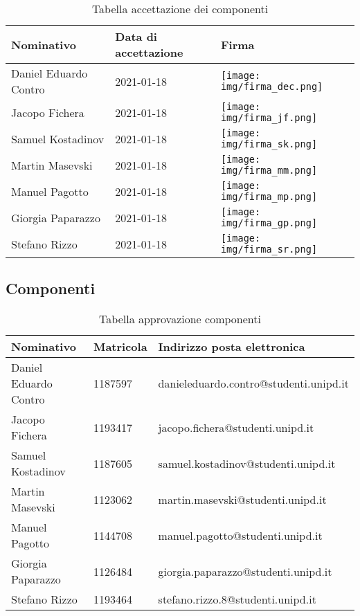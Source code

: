 \documentclass[../piano_di_progetto.tex]{subfiles}
\begin{document}
\begin{table}[!ht]
	\centering
	\begin{tabular}{|l|l|l|}
		\hline
		\rowcolor{lightgray}
		\textbf{Nominativo} & \textbf{Data di accettazione} & \textbf{Firma} \\ 
		\hline
		Daniel Eduardo Contro & 2021-01-18 & \texttt{[image: img/firma\_dec.png]} \\ 
		Jacopo Fichera & 2021-01-18 & \texttt{[image: img/firma\_jf.png]} \\ 
		Samuel Kostadinov & 2021-01-18 & \texttt{[image: img/firma\_sk.png]} \\
		Martin Masevski & 2021-01-18 & \texttt{[image: img/firma\_mm.png]} \\ 
		Manuel Pagotto & 2021-01-18 & \texttt{[image: img/firma\_mp.png]}  \\ 
		Giorgia Paparazzo & 2021-01-18 & \texttt{[image: img/firma\_gp.png]} \\
		Stefano Rizzo & 2021-01-18 & \texttt{[image: img/firma\_sr.png]}  \\ 
		\hline

	\end{tabular}
		\caption{Tabella accettazione dei componenti}
\end{table}

\newpage
\subsection{Componenti}%
\label{sub:comp}

\begin{table}[!ht]
	\centering
	\begin{tabular}{|l|l|l|}
		\hline
		\rowcolor{lightgray}
		\textbf{Nominativo} & \textbf{Matricola} & \textbf{Indirizzo posta elettronica} \\ 
		\hline
		Daniel Eduardo Contro & 1187597 & danieleduardo.contro@studenti.unipd.it \\ 
		Jacopo Fichera & 1193417  & jacopo.fichera@studenti.unipd.it \\ 
		Samuel Kostadinov & 1187605 & samuel.kostadinov@studenti.unipd.it \\ 
		Martin Masevski & 1123062 & martin.masevski@studenti.unipd.it \\ 
		Manuel Pagotto & 1144708 & manuel.pagotto@studenti.unipd.it \\ 
		Giorgia Paparazzo & 1126484 & giorgia.paparazzo@studenti.unipd.it \\ 
		Stefano Rizzo & 1193464 & stefano.rizzo.8@studenti.unipd.it \\ 
		\hline
	\end{tabular}
		\caption{Tabella approvazione componenti}
\end{table}
\end{document}
